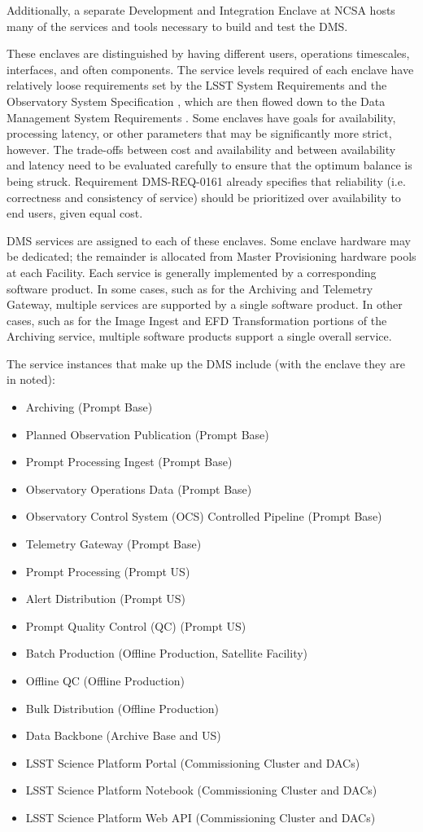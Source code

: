 \documentclass[DM,toc,lsstdraft]{lsstdoc}
\begin{document}
Additionally, a separate Development and Integration Enclave at NCSA hosts many of the services and tools necessary to build and test the DMS.

These enclaves are distinguished by having different users, operations timescales, interfaces, and often components.
The service levels required of each enclave have relatively loose requirements set by the LSST System Requirements  and the Observatory System Specification , which are then flowed down to the Data Management System Requirements .
Some enclaves have goals for availability, processing latency, or other parameters that may be significantly more strict, however.
The trade-offs between cost and availability and between availability and latency need to be evaluated carefully to ensure that the optimum balance is being struck.
Requirement DMS-REQ-0161 already specifies that reliability (i.e. correctness and consistency of service) should be prioritized over availability to end users, given equal cost.

DMS services are assigned to each of these enclaves.  Some enclave hardware may be dedicated; the remainder is allocated from Master Provisioning hardware pools at each Facility.
Each service is generally implemented by a corresponding software product.
In some cases, such as for the Archiving and Telemetry Gateway, multiple services are supported by a single software product.
In other cases, such as for the Image Ingest and EFD Transformation portions of the Archiving service, multiple software products support a single overall service.

The service instances that make up the DMS include (with the
enclave they are in noted):
\begin{itemize}
\item
  Archiving (Prompt Base)
\item
  Planned Observation Publication (Prompt Base)
\item
  Prompt Processing Ingest (Prompt Base)
\item
  Observatory Operations Data (Prompt Base)
\item
  Observatory Control System (OCS) Controlled Pipeline (Prompt Base)
\item
  Telemetry Gateway (Prompt Base)
\item
  Prompt Processing (Prompt US)
\item
  Alert Distribution (Prompt US)
\item
  Prompt Quality Control (QC) (Prompt US)
\item
  Batch Production (Offline Production, Satellite Facility)
\item
  Offline QC (Offline Production)
\item
  Bulk Distribution (Offline Production)
\item
  Data Backbone (Archive Base and US)
\item
  LSST Science Platform Portal (Commissioning Cluster and DACs)
\item
  LSST Science Platform Notebook (Commissioning Cluster and DACs)
\item
  LSST Science Platform Web API (Commissioning Cluster and DACs)
\end{itemize}
\end{document}

